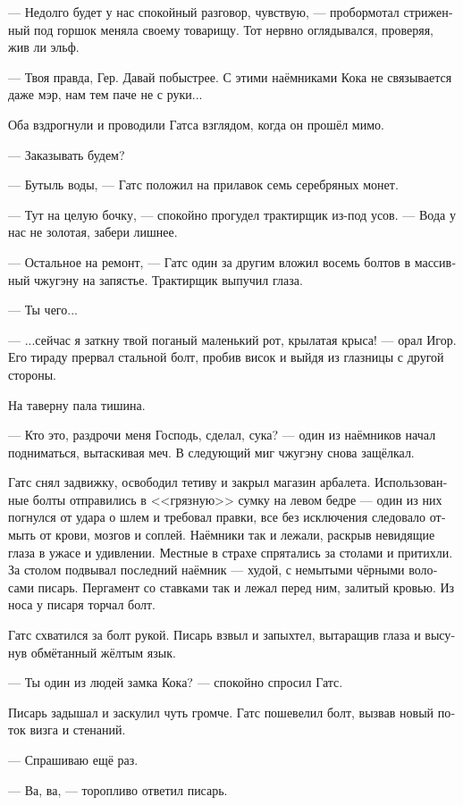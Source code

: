 \documentclass[a4paper,12pt,fleqn]{book}\usepackage{polyglossia}\setdefaultlanguage[babelshorthands=true]{russian}\setotherlanguage{english}\defaultfontfeatures{Ligatures=TeX,Mapping=tex-text}\usepackage{xcolor}\newcommand{\ml}[3]{#2}
\newcommand{\asterism}{\vspace{1em}{\centering\Large\bfseries$\ast~\ast~\ast$\par}\vspace{1em}}
\begin{document}
--- Недолго будет у нас спокойный разговор, чувствую, --- пробормотал стриженный под горшок меняла своему товарищу.
Тот нервно оглядывался, проверяя, жив ли эльф.

--- Твоя правда, Гер.
Давай побыстрее.
С этими наёмниками Кока не связывается даже мэр, нам тем паче не с руки...

Оба вздрогнули и проводили Гатса взглядом, когда он прошёл мимо.

\asterism

--- Заказывать будем?

--- Бутыль воды, --- Гатс положил на прилавок семь серебряных монет.

--- Тут на целую бочку, --- спокойно прогудел трактирщик из-под усов.
--- Вода у нас не золотая, забери лишнее.

--- Остальное на ремонт, --- Гатс один за другим вложил восемь болтов в массивный чжугэну на запястье.
Трактирщик выпучил глаза.

--- Ты чего...

--- ...сейчас я заткну твой поганый маленький рот, крылатая крыса! --- орал Игор.
Его тираду прервал стальной болт, пробив висок и выйдя из глазницы с другой стороны.

На таверну пала тишина.

--- Кто это, раздрочи меня Господь, сделал, сука? --- один из наёмников начал подниматься, вытаскивая меч.
В следующий миг чжугэну снова защёлкал.

Гатс снял задвижку, освободил тетиву и закрыл магазин арбалета.
Использованные болты отправились в <<грязную>> сумку на левом бедре --- один из них погнулся от удара о шлем и требовал правки, все без исключения следовало отмыть от крови, мозгов и соплей.
Наёмники так и лежали, раскрыв невидящие глаза в ужасе и удивлении.
Местные в страхе спрятались за столами и притихли.
За столом подвывал последний наёмник --- худой, с немытыми чёрными волосами писарь.
Пергамент со ставками так и лежал перед ним, залитый кровью.
Из носа у писаря торчал болт.

Гатс схватился за болт рукой.
Писарь взвыл и запыхтел, вытаращив глаза и высунув обмётанный жёлтым язык.

--- Ты один из людей замка Кока? --- спокойно спросил Гатс.

Писарь задышал и заскулил чуть громче.
Гатс пошевелил болт, вызвав новый поток визга и стенаний.

--- Спрашиваю ещё раз.

--- Ва, ва, --- торопливо ответил писарь.
\end{document}
